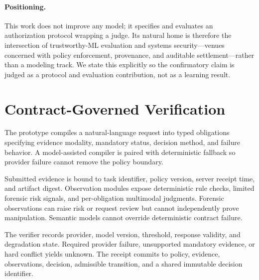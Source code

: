 \documentclass[sigconf,anonymous,review]{acmart}
\begin{document}
\paragraph{Positioning.} This work does not improve any model; it specifies and evaluates an authorization protocol wrapping a judge. Its natural home is therefore the intersection of trustworthy-ML evaluation and systems security---venues concerned with policy enforcement, provenance, and auditable settlement---rather than a modeling track. We state this explicitly so the confirmatory claim is judged as a protocol and evaluation contribution, not as a learning result.

\section{Contract-Governed Verification}
The prototype compiles a natural-language request into typed obligations specifying evidence modality, mandatory status, decision method, and failure behavior. A model-assisted compiler is paired with deterministic fallback so provider failure cannot remove the policy boundary.

Submitted evidence is bound to task identifier, policy version, server receipt time, and artifact digest. Observation modules expose deterministic rule checks, limited forensic risk signals, and per-obligation multimodal judgments. Forensic observations can raise risk or request review but cannot independently prove manipulation. Semantic models cannot override deterministic contract failure.

The verifier records provider, model version, threshold, response validity, and degradation state. Required provider failure, unsupported mandatory evidence, or hard conflict yields unknown. The receipt commits to policy, evidence, observations, decision, admissible transition, and a shared immutable decision identifier.
\end{document}
